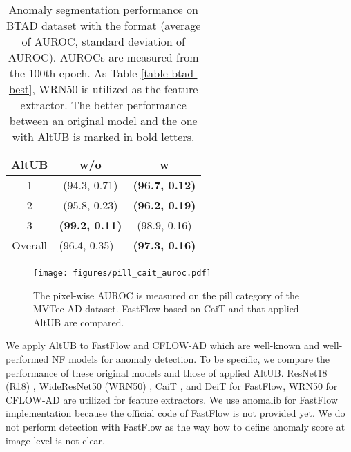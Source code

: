 \documentclass[letterpaper]{article}
\begin{document}
\begin{table}[t]
\caption{Anomaly segmentation performance on BTAD dataset with the format  (average of AUROC, standard deviation of AUROC). AUROCs are measured from the 100th epoch. As Table \ref{table-btad-best}, WRN50 is utilized as the feature extractor. The better performance between an original model and the one with AltUB is marked in bold letters.}
\label{table-btad-stability}
\centering
\begin{tabular}{c|cc}
\hline
AltUB                    & w/o                              & w                                         \\ \hline
1                        & (94.3, 0.71)                     & \textbf{(96.7, 0.12)}                     \\
2                        & (95.8, 0.23)                     & \textbf{(96.2, 0.19)}                     \\
3                        & \textbf{(99.2, 0.11)}            & (98.9, 0.16)                              \\ \hline
\multicolumn{1}{c|}{Overall} & \multicolumn{1}{l}{(96.4, 0.35)} & \multicolumn{1}{l}{\textbf{(97.3, 0.16)}} \\ \hline
\end{tabular}
\end{table}

\begin{figure}[t]
\begin{center}
\centerline{\texttt{[image: figures/pill\_cait\_auroc.pdf]}}
\caption{The pixel-wise AUROC is measured on the pill category of the MVTec AD dataset. FastFlow based on CaiT and that applied AltUB are compared.}
\label{figure-fastflow-auroc}
\end{center}
\end{figure}

We apply AltUB to FastFlow and CFLOW-AD which are well-known and well-performed NF models for anomaly detection. To be specific, we compare the performance of these original models and those of applied AltUB. ResNet18 (R18) \cite{resnet}, WideResNet50 (WRN50) \cite{wideresnet}, CaiT \cite{cait}, and DeiT \cite{deit} for FastFlow, WRN50 for CFLOW-AD are utilized for feature extractors. We use anomalib \cite{anomalib} for FastFlow implementation because the official code of FastFlow is not provided yet. We do not perform detection with FastFlow as the way how to define anomaly score at image level is not clear.
\end{document}
